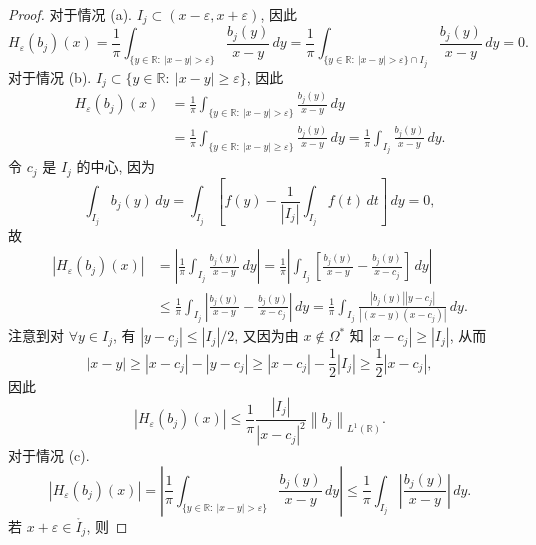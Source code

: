 \documentclass[a4paper,11pt]{article}
\theoremstyle{definition}
\begin{document}
\begin{CJK*}{UTF8}{gbsn}
\begin{proof}
    对于情况 (a). $ I_j \subset (x - \varepsilon, x + \varepsilon) $, 因此
    $$
        H_\varepsilon (b_j) (x) 
            = \frac{1}{\pi} \int_{\{ y \in \mathbb{R} :\ |x - y| > \varepsilon \}}
                \frac{b_j(y)}{x - y} \, dy
            = \frac{1}{\pi} \int_{\{ y \in \mathbb{R} :\ |x - y| > \varepsilon \} \cap I_j}
                \frac{b_j(y)}{x - y} \, dy
            = 0.
    $$
    对于情况 (b). $ I_j \subset \{ y \in \mathbb{R} :\ |x - y| \geq \varepsilon \} $, 因此
    \begin{align*}
        H_\varepsilon (b_j) (x) 
            &= \frac{1}{\pi} \int_{\{ y \in \mathbb{R} :\ |x - y| > \varepsilon \}} \frac{b_j(y)}{x - y} \, dy \\
            &= \frac{1}{\pi} \int_{\{ y \in \mathbb{R} :\ |x - y| \geq \varepsilon \}} \frac{b_j(y)}{x - y} \, dy
            = \frac{1}{\pi} \int_{I_j} \frac{b_j(y)}{x - y} \, dy.
    \end{align*}
    令 $ c_j $ 是 $ I_j $ 的中心, 因为 
    $$ 
        \int_{I_j} b_j(y) \, dy 
            = \int_{I_j} \left[ f(y) - \frac{1}{|I_j|} \int_{I_j} f(t) \, dt \right]  \, dy 
            = 0,
    $$
    故
    \begin{align*}
        \left| H_\varepsilon (b_j) (x)\right| 
            &= \left| \frac{1}{\pi} \int_{I_j} \frac{b_j(y)}{x - y} \, dy \right|
            = \frac{1}{\pi} \left| \int_{I_j} \left[ \frac{b_j(y)}{x - y} 
                - \frac{b_j(y)}{x - c_j} \right] \, dy \right| \\
            &\leq \frac{1}{\pi} \int_{I_j} \left| \frac{b_j(y)}{x - y} - \frac{b_j(y)}{x - c_j} \right| \, dy
            = \frac{1}{\pi} \int_{I_j} \frac{|b_j(y)||y - c_j|}{|(x - y)(x - c_j)|} \, dy.
    \end{align*}
    注意到对 $ \forall y \in I_j $, 有 $  |y - c_j| \leq |I_j |/2 $,
    又因为由 $ x \notin \Omega^* $ 知 $ |x - c_j| \geq |I_j| $, 从而
    $$
        |x - y| \geq |x - c_j| - |y - c_j|
                \geq |x - c_j| - \frac{1}{2} |I_j|
                \geq \frac{1}{2} |x - c_j|,
    $$
    因此
    $$
        \left| H_\varepsilon (b_j) (x)\right| 
            \leq \frac{1}{\pi} \frac{|I_j|}{|x - c_j|^2} \left\|b_j\right\|_{L^1(\mathbb{R})}.
    $$
    对于情况 (c). 
    $$
        |H_\varepsilon (b_j) (x)|
            = \left| \frac{1}{\pi} \int_{\{ y \in \mathbb{R} :\ |x - y| > \varepsilon \}} 
                \frac{b_j(y)}{x - y} \, dy \right| 
            \leq \frac{1}{\pi} \int_{I_j} \left| \frac{b_j(y)}{x - y} \right| \, dy.
    $$
    若 $ x + \varepsilon \in \mathring{I_j} $, 则

\end{proof}
\end{CJK*}
\end{document}
